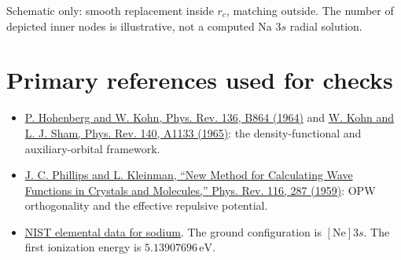 \begin{center}

\small Schematic only: smooth replacement inside $r_c$, matching outside. The number of depicted inner nodes is illustrative, not a computed Na $3s$ radial solution.
\end{center}

\section*{Primary references used for checks}
\begin{itemize}
\item \href{https://journals.aps.org/pr/abstract/10.1103/PhysRev.136.B864}{P. Hohenberg and W. Kohn, Phys. Rev. 136, B864 (1964)} and
\href{https://journals.aps.org/pr/abstract/10.1103/PhysRev.140.A1133}{W. Kohn and L. J. Sham, Phys. Rev. 140, A1133 (1965)}: the density-functional and auxiliary-orbital framework.
\item \href{https://journals.aps.org/pr/abstract/10.1103/PhysRev.116.287}{J. C. Phillips and L. Kleinman, ``New Method for Calculating Wave Functions in Crystals and Molecules,'' Phys. Rev. 116, 287 (1959)}: OPW orthogonality and the effective repulsive potential.
\item \href{https://physics.nist.gov/cgi-bin/Elements/elInfo.pl?context=text\&element=11}{NIST elemental data for sodium}.
The ground configuration is $[\mathrm{Ne}]3s$. The first ionization energy is $5.13907696\,\mathrm{eV}$.
\end{itemize}
